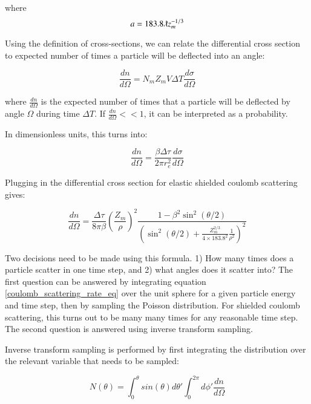 \documentclass[]{article}
\begin{document}
where
\begin{equation} 
a=183.8 \lambdabar z_m^{-1/3}
\end{equation}

Using the definition of cross-sections, we can relate the differential cross section to expected number of times a particle will be deflected into an angle:

\begin{equation} 
\frac{dn}{d \Omega} =N_m Z_m V \Delta T \frac{d \sigma}{d \Omega}
\end{equation}

where $\frac{dn}{d \Omega}$ is the expected number of times that a particle will be deflected by angle $\Omega$ during time $\Delta T$. If $\frac{dn}{d \Omega} << 1$, it can be interpreted as a probability. 

In dimensionless units, this turns into:

\begin{equation} 
\frac{dn}{d \Omega} =\frac{ \beta \Delta \tau }{2 \pi r_e^2} \frac{d \sigma}{d \Omega}
\end{equation}

Plugging in the differential cross section for elastic shielded coulomb scattering gives:

\begin{equation}
\label{coulomb_scattering_rate_eq}
\frac{dn}{d \Omega} =\frac{ \Delta \tau }{8 \pi \beta }\left( \frac{Z_m}{\rho} \right)^2  \frac{1-\beta^2\sin^2(\theta/2)}{ \left(  \sin^2(\theta/2) + \frac{Z_m^{2/3}}{4\times 183.8^2} \frac{1}{\rho^2} \right)^2 }
\end{equation}

Two decisions need to be made using this formula. 1) How many times does a particle scatter in one time step, and 2) what angles does it scatter into? The first question can be answered by integrating equation \ref{coulomb_scattering_rate_eq} over the unit sphere for a given particle energy and time step, then by sampling the Poisson distribution. For shielded coulomb scattering, this turns out to be many many times for any reasonable time step. The second question is answered using inverse transform sampling. 

Inverse transform sampling is performed by first integrating the distribution over the relevant variable that needs to be sampled:

\begin{equation}
N(\theta) = \int_0^{\theta} sin(\theta ) d\theta '  \int_0^{2\pi} d\phi ' \frac{dn}{d\Omega}
\end{equation}
\end{document}
